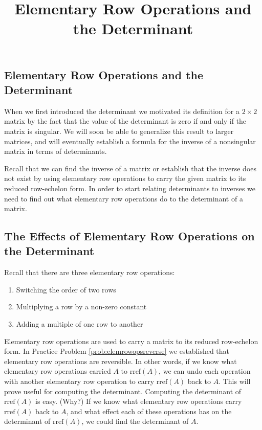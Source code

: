 \documentclass{ximera}
\title{Elementary Row Operations and the Determinant} \license{CC BY-NC-SA 4.0}
\begin{document}
\begin{abstract}
 \end{abstract}
\maketitle

\begin{onlineOnly}
\section*{Elementary Row Operations and the Determinant}
\end{onlineOnly}

When we first introduced the determinant we motivated its definition for a $2\times 2$ matrix by the fact that the value of the determinant is zero if and only if the matrix is singular.  We will soon be able to generalize this result to larger matrices, and will eventually establish a formula for the inverse of a nonsingular matrix in terms of determinants.  

Recall that we can find the inverse of a matrix or establish that the inverse does not exist by using elementary row operations to carry the given matrix to its reduced row-echelon form.  In order to start relating determinants to inverses we need to find out what elementary row operations do to the determinant of a matrix.  

\subsection*{The Effects of Elementary Row Operations on the Determinant}
Recall that there are three elementary row operations:
\begin{enumerate}
\item Switching the order of two rows
\item Multiplying a row by a non-zero constant
\item Adding a multiple of one row to another
\end{enumerate}

Elementary row operations are used to carry a matrix to its reduced row-echelon form.  In Practice Problem \ref{prob:elemrowopsreverse} we established that elementary row operations are reversible.  In other words, if we know what elementary row operations   carried $A$ to $\mbox{rref}(A)$, we can undo each operation with another elementary row operation to carry $\mbox{rref}(A)$ back to $A$.  This will prove useful for computing the determinant.  Computing the determinant of $\mbox{rref}(A)$ is easy. (Why?)  If we know what elementary row operations carry $\mbox{rref}(A)$ back to $A$, and what effect each of these operations has on the determinant of $\mbox{rref}(A)$, we could find the determinant of $A$.  
\end{document}
